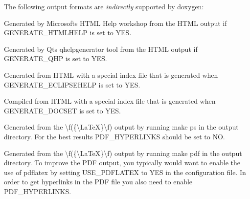 The following output formats are {\itshape indirectly} supported by doxygen\+: 
\begin{DoxyDescription}
\item[{\bfseries{Compiled H\+T\+ML Help}} (a.\+k.\+a. Windows 98 help) ]Generated by Microsoft\textquotesingle{}s H\+T\+ML Help workshop from the H\+T\+ML output if G\+E\+N\+E\+R\+A\+T\+E\+\_\+\+H\+T\+M\+L\+H\+E\+LP is set to {\ttfamily Y\+ES}. 
\item[{\bfseries{Qt Compressed Help (.qch)}} ]Generated by Qt\textquotesingle{}s qhelpgenerator tool from the H\+T\+ML output if G\+E\+N\+E\+R\+A\+T\+E\+\_\+\+Q\+HP is set to {\ttfamily Y\+ES}. 
\item[{\bfseries{Eclipse Help}} ]Generated from H\+T\+ML with a special index file that is generated when G\+E\+N\+E\+R\+A\+T\+E\+\_\+\+E\+C\+L\+I\+P\+S\+E\+H\+E\+LP is set to {\ttfamily Y\+ES}. 
\item[{\bfseries{X\+Code Doc\+Sets}} ]Compiled from H\+T\+ML with a special index file that is generated when G\+E\+N\+E\+R\+A\+T\+E\+\_\+\+D\+O\+C\+S\+ET is set to {\ttfamily Y\+ES}. 
\item[{\bfseries{Post\+Script}} ]Generated from the \textbackslash{}f(\{\textbackslash{}\+La\+TeX\}\textbackslash{}f) output by running {\ttfamily make ps} in the output directory. For the best results P\+D\+F\+\_\+\+H\+Y\+P\+E\+R\+L\+I\+N\+KS should be set to {\ttfamily NO}. 
\item[{\bfseries{P\+DF}} ]Generated from the \textbackslash{}f(\{\textbackslash{}\+La\+TeX\}\textbackslash{}f) output by running {\ttfamily make pdf} in the output directory. To improve the P\+DF output, you typically would want to enable the use of {\ttfamily pdflatex} by setting U\+S\+E\+\_\+\+P\+D\+F\+L\+A\+T\+EX to {\ttfamily Y\+ES} in the configuration file. In order to get hyperlinks in the P\+DF file you also need to enable P\+D\+F\+\_\+\+H\+Y\+P\+E\+R\+L\+I\+N\+KS. 
\end{DoxyDescription}

 